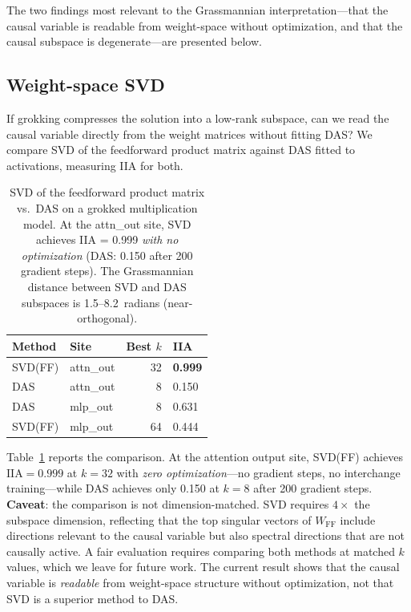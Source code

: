 \documentclass{article}
\newcommand{\IIA}{\mathrm{IIA}}
\begin{document}
The two findings most relevant to the Grassmannian interpretation---that
the causal variable is readable from weight-space without optimization,
and that the causal subspace is degenerate---are presented below.

\subsection{Weight-space SVD}
\label{sec:svd_vs_das}

If grokking compresses the solution into a low-rank subspace, can we read the
causal variable directly from the weight matrices without fitting DAS? We
compare SVD of the feedforward product matrix against DAS fitted to
activations, measuring IIA for both.

\begin{table}[t]
\centering
\small
\begin{tabular}{llrl}
\toprule
Method & Site & Best $k$ & IIA \\
\midrule
SVD(FF) & attn\_out & 32 & \textbf{0.999} \\
DAS     & attn\_out & 8  & 0.150 \\
DAS     & mlp\_out  & 8  & 0.631 \\
SVD(FF) & mlp\_out  & 64 & 0.444 \\
\bottomrule
\end{tabular}
\caption{SVD of the feedforward product matrix vs.\ DAS on a grokked
multiplication model. At the attn\_out site, SVD achieves IIA = 0.999
\emph{with no optimization} (DAS: 0.150 after 200 gradient steps).
The Grassmannian distance between SVD and DAS subspaces is
1.5--8.2~radians (near-orthogonal).}
\label{tab:svd_vs_das}
\end{table}

Table~\ref{tab:svd_vs_das} reports the comparison. At the attention output
site, SVD(FF) achieves $\IIA = 0.999$ at $k = 32$
with \emph{zero optimization}---no gradient steps, no interchange
training---while DAS achieves only 0.150 at $k = 8$ after 200 gradient
steps. \textbf{Caveat}: the comparison is not dimension-matched. SVD
requires $4\times$ the subspace dimension, reflecting that the top singular
vectors of $W_\text{FF}$ include directions relevant to the causal variable
but also spectral directions that are not causally active. A fair evaluation
requires comparing both methods at matched $k$ values, which we leave for
future work. The current result shows that the causal variable is
\emph{readable} from weight-space structure without optimization, not that
SVD is a superior method to DAS.
\end{document}

